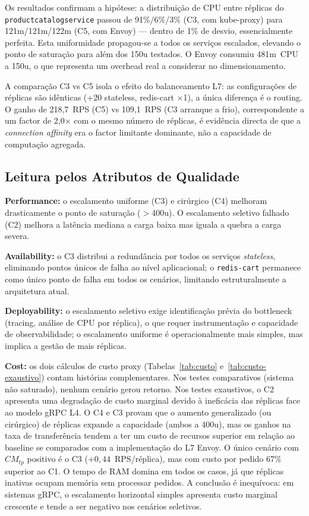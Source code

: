 \documentclass[manuscript,screen,review]{acmart}
\begin{document}
Os resultados confirmam a hipótese: a distribuição de CPU entre réplicas do \texttt{productcatalogservice} passou de 91\%/6\%/3\% (C3, com kube-proxy) para 121m/121m/122m (C5, com Envoy) — dentro de 1\% de desvio, essencialmente perfeita. Esta uniformidade propagou-se a todos os serviços escalados, elevando o ponto de saturação para além dos 150u testados. O Envoy consumiu 481m~CPU a 150u, o que representa um overhead real a considerar no dimensionamento.

A comparação C3 vs C5 isola o efeito do balanceamento L7: as configurações de réplicas são idênticas (+20 stateless, redis-cart ×1), a única diferença é o routing. O ganho de 218,7~RPS (C5) vs 109,1~RPS (C3 arranque a frio), correspondente a um factor de 2,0× com o mesmo número de réplicas, é evidência directa de que a \textit{connection affinity} era o factor limitante dominante, não a capacidade de computação agregada.

\subsection{Leitura pelos Atributos de Qualidade}

\textbf{Performance:} o escalamento uniforme (C3) e cirúrgico (C4) melhoram drasticamente o ponto de saturação ($>$400u). O escalamento seletivo falhado (C2) melhora a latência mediana a carga baixa mas iguala a quebra a carga severa.

\textbf{Availability:} o C3 distribui a redundância por todos os serviços \textit{stateless}, eliminando pontos únicos de falha ao nível aplicacional; o \texttt{redis-cart} permanece como único ponto de falha em todos os cenários, limitando estruturalmente a arquitetura atual.

\textbf{Deployability:} o escalamento seletivo exige identificação prévia do bottleneck (tracing, análise de CPU por réplica), o que requer instrumentação e capacidade de observabilidade; o escalamento uniforme é operacionalmente mais simples, mas implica a gestão de mais réplicas.

\textbf{Cost:} os dois cálculos de custo proxy (Tabelas~\ref{tab:custo} e~\ref{tab:custo-exaustivo}) contam histórias complementares. Nos testes comparativos (sistema não saturado), nenhum cenário gerou retorno. Nos testes exaustivos, o C2 apresenta uma degradação de custo marginal devido à ineficácia das réplicas face ao modelo gRPC L4. O C4 e C3 provam que o aumento generalizado (ou cirúrgico) de réplicas expande a capacidade (ambos a 400u), mas os ganhos na taxa de transferência tendem a ter um custo de recursos superior em relação ao baseline se comparados com a implementação do L7 Envoy. O único cenário com $CM_{tp}$ positivo é o C3 ($+0{,}44$~RPS/réplica), mas com custo por pedido 67\% superior ao C1. O tempo de RAM domina em todos os casos, já que réplicas inativas ocupam memória sem processar pedidos. A conclusão é inequívoca: em sistemas gRPC, o escalamento horizontal simples apresenta custo marginal crescente e tende a ser negativo nos cenários seletivos.
\end{document}

